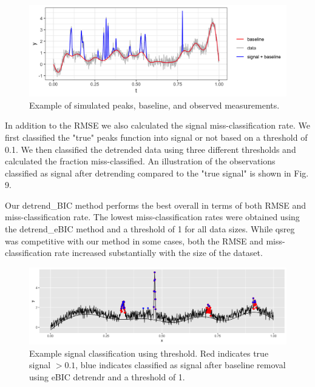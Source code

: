\documentclass[12pt]{article}
\begin{document}
	\begin{figure}[h]
		\caption{Example of simulated peaks, baseline, and observed measurements.}
		\includegraphics[width = \linewidth]{Figures/ex_peaks.png}
	\end{figure}

	In addition to the RMSE we also calculated the signal miss-classification rate. We first classified the "true" peaks function into signal or not based on a threshold of 0.1. We then classified the detrended data using three different thresholds and calculated the fraction miss-classified. An illustration of the observations classified as signal after detrending compared to the "true signal" is shown in Fig. 9. 
	
	
	Our detrend\_BIC method performs the best overall in terms of both RMSE and miss-classification rate. The lowest miss-classification rates were obtained using the detrend\_eBIC method and a threshold of 1 for all data sizes. While qsreg was competitive with our method in some cases, both the RMSE and miss-classification rate increased substantially with the size of the dataset. 
	
	\begin{figure}[h!]
		\caption{Example signal classification using threshold. Red indicates true signal $>0.1$, blue indicates classified as signal after baseline removal using eBIC detrendr and a threshold of 1.}
		\includegraphics[width = \linewidth]{Figures/peaks_eg_class.png}
	\end{figure}
	
\end{document}
